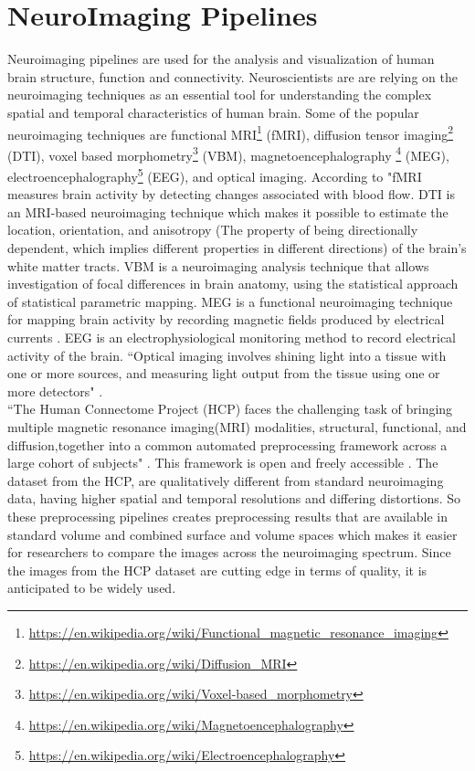 \section{NeuroImaging Pipelines}
Neuroimaging pipelines are used for the analysis and visualization of human brain structure, function and connectivity. Neuroscientists are are relying on the neuroimaging techniques as an essential tool for understanding the complex spatial and temporal characteristics of human brain. Some of the popular neuroimaging techniques are  functional MRI\footnote{\url{https://en.wikipedia.org/wiki/Functional_magnetic_resonance_imaging}} (fMRI), diffusion tensor imaging\footnote{\url{https://en.wikipedia.org/wiki/Diffusion_MRI}} (DTI), voxel based morphometry\footnote{\url{https://en.wikipedia.org/wiki/Voxel-based_morphometry}} (VBM), magnetoencephalography \footnote{\url{https://en.wikipedia.org/wiki/Magnetoencephalography}} (MEG), electroencephalography\footnote{\url{https://en.wikipedia.org/wiki/Electroencephalography}} (EEG), and optical imaging. According to "fMRI measures brain activity by detecting changes associated with blood flow. DTI is an MRI-based neuroimaging technique which makes it possible to estimate the location, orientation, and anisotropy (The property of being directionally dependent, which implies different properties in different directions) of the brain's white matter tracts. VBM is a neuroimaging analysis technique that allows investigation of focal differences in brain anatomy, using the statistical approach of statistical parametric mapping. MEG is a functional neuroimaging technique for mapping brain activity by recording magnetic fields produced by electrical currents . EEG is an electrophysiological monitoring method to record electrical activity of the brain. ``Optical imaging involves shining light into a tissue with one or more sources, and measuring light output from the tissue using one or more detectors" \cite{doi:10.1080/23273798.2017.1290810}.\\

``The Human Connectome Project (HCP) faces the challenging task of bringing multiple magnetic resonance imaging(MRI) modalities, structural, functional, and diffusion,together into a common automated preprocessing framework across a large cohort of subjects" \cite{}. This framework is open and freely accessible \cite{Gla13}. The dataset from the HCP, are qualitatively different from standard neuroimaging data, having higher spatial and temporal resolutions and differing distortions. So these preprocessing pipelines creates preprocessing results that are available in standard volume and combined surface and volume spaces which makes it easier for researchers to compare the images across the neuroimaging spectrum. Since the images from the HCP dataset are cutting edge in terms of quality, it is anticipated to be widely used.\\

